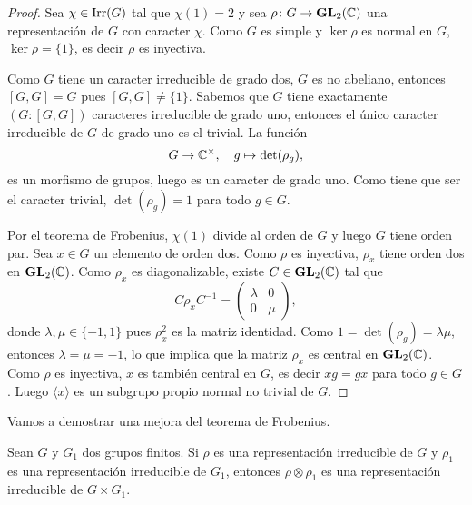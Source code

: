 \begin{proof}
    Sea $\chi\in\operatorname{Irr}(G)$ tal que $\chi(1)=2$ y sea
    $\rho\colon G\to\mathbf{GL}_2(\mathbb{C})$ una representación de $G$ con caracter $\chi$. Como $G$ es simple y $\ker\rho$ es normal en $G$, 
    $\ker\rho=\{1\}$, es decir $\rho$ es inyectiva. 
    
    Como $G$ tiene un caracter irreducible de grado dos, $G$ es no abeliano, entonces 
    $[G,G]=G$ pues $[G,G]\ne\{1\}$. Sabemos que $G$ tiene exactamente $(G:[G,G])$ caracteres irreducible de grado uno, entonces 
    el único caracter irreducible de $G$ de grado uno es el trivial. La función
    \[
    G\to\mathbb{C}^{\times},\quad
    g\mapsto\det(\rho_g),
    \]
    es un morfismo de grupos, luego es un caracter de grado uno. Como tiene que ser el caracter trivial, 
    $\det(\rho_g)=1$ para todo $g\in G$. 
    
    Por el teorema de Frobenius, 
    $\chi(1)$ divide al orden de $G$ y luego 
    $G$ tiene orden par. Sea $x\in G$ un elemento de orden dos. Como $\rho$ es inyectiva, 
    $\rho_x$ tiene orden dos en $\mathbf{GL}_2(\mathbb{C})$. Como $\rho_x$ es diagonalizable, existe $C\in\mathbf{GL}_2(\mathbb{C})$ tal que
    \[
    C\rho_xC^{-1}=\begin{pmatrix}
    \lambda & 0\\
    0 & \mu 
    \end{pmatrix},
    \]
    donde $\lambda,\mu\in\{-1,1\}$ pues $\rho_x^2$ es la matriz identidad. Como $1=\det(\rho_g)=\lambda\mu$, entonces
    $\lambda=\mu=-1$, lo que implica que la matriz $\rho_x$ es central en $\mathbf{GL}_2(\mathbb{C})$. Como $\rho$ es inyectiva, 
    $x$ es también central en $G$, es decir $xg=gx$ para todo $g\in G$. Luego $\langle x\rangle$ es un subgrupo propio 
    normal no trivial de $G$.
\end{proof}

Vamos a demostrar una mejora del teorema de Frobenius. 

\begin{proposition}
Sean $G$ y $G_1$ dos grupos finitos. 
Si $\rho$ es una representación irreducible de $G$ y $\rho_1$ es
  una representación irreducible de $G_1$, entonces $\rho\otimes\rho_1$ 
  es una representación irreducible de $G\times G_1$. 
\end{proposition}

